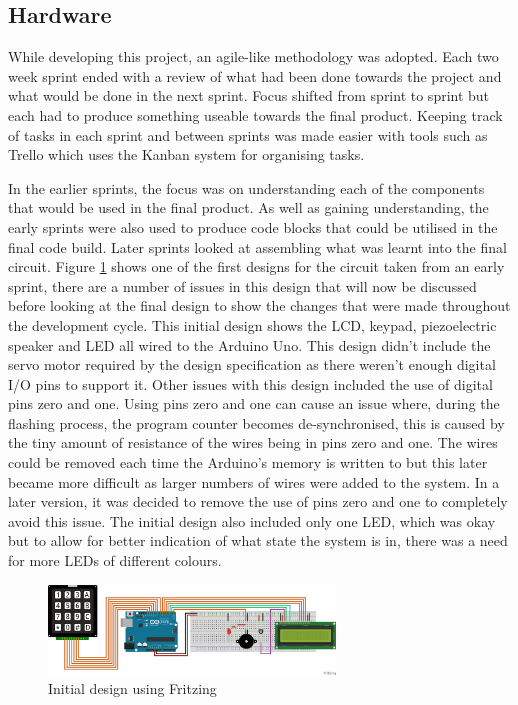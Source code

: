 
  \subsection*{Hardware}
  
  While developing this project, an agile-like methodology was adopted.
  Each two week sprint ended with a review of what had been done towards the project and what would be done in the next sprint.
  Focus shifted from sprint to sprint but each had to produce something useable towards the final product.
  Keeping track of tasks in each sprint and between sprints was made easier with tools such as Trello which uses the Kanban system for organising tasks.

  In the earlier sprints, the focus was on understanding each of the components that would be used in the final product.
  As well as gaining understanding, the early sprints were also used to produce code blocks that could be utilised in the final code build.
    Later sprints looked at assembling what was learnt into the final circuit.
  Figure \ref{fig:one} shows one of the first designs for the circuit taken from an early sprint, there are a number of issues in this design that will now be discussed before looking at the final design to show the changes that were made throughout the development cycle.
  This initial design shows the LCD, keypad, piezoelectric speaker and LED all wired to the Arduino Uno.
  This design didn't include the servo motor required by the design specification as there weren't enough digital I/O pins to support it.
  Other issues with this design included the use of digital pins zero and one.
  Using pins zero and one can cause an issue where, during the flashing process, the program counter becomes de-synchronised, this is caused by the tiny amount of resistance of the wires being in pins zero and one.
  The wires could be removed each time the Arduino's memory is written to but this later became more difficult as larger numbers of wires were added to the system.
  In a later version, it was decided to remove the use of pins zero and one to completely avoid this issue.
  The initial design also included only one LED, which was okay but to allow for better indication of what state the system is in, there was a need for more LEDs of different colours.
 \begin{figure}[h]
    \vspace{0.3cm}
    \begin{center}
      \includegraphics[width=0.68\textwidth]{initial.jpg}
    \end{center}
    \vspace{-20pt}
    \caption{Initial design using Fritzing}
    \label{fig:one}
    \vspace{0.3cm}
  \end{figure}

